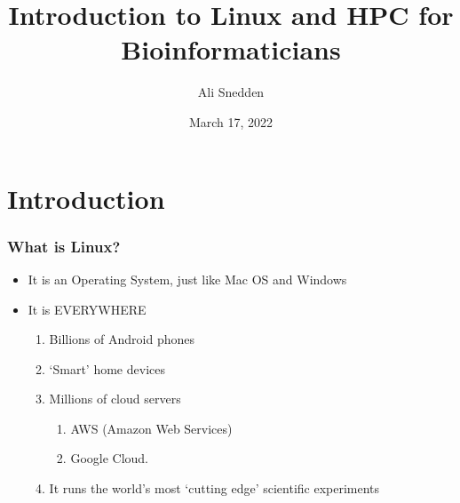 \documentclass{beamer}
\title{Introduction to Linux and HPC for Bioinformaticians }
\author{Ali Snedden}
\institute{Nationwide Children's Hospital}
\date{March 17, 2022}
\begin{document}
 
\frame{\titlepage}

\section{Introduction}

\begin{frame}
\frametitle{What is Linux?}
\begin{itemize}
    \item It is an Operating System, just like Mac OS and Windows  
    \pause 
    \item It is EVERYWHERE
    \begin{enumerate}
        \item Billions of Android phones 
        \pause 
        \item `Smart' home devices 
        \pause 
        \item Millions of cloud servers
        \begin{enumerate}
            \item AWS (Amazon Web Services)
            \pause
            \item Google Cloud.
        \end{enumerate}
        \pause 
        \item It runs the world's most `cutting edge' scientific experiments
    \end{enumerate}
\end{itemize}
\end{frame}
\end{document}
